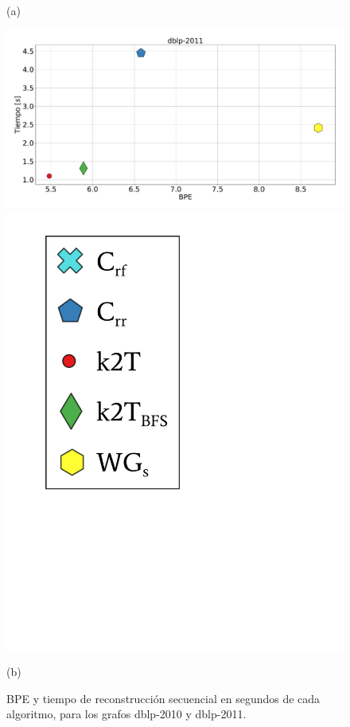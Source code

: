 \begin{figure}
\begin{minipage}{1\textwidth}
    			(a)		
    	\end{minipage}
    	
       	\begin{minipage}{1\textwidth}
    			\centering
    			\begin{minipage}{0.8\textwidth}
    				\centering
    				\includegraphics[width=1\linewidth]{img/bpeTimes/secuencial/dblp-2011.pdf}
    			\end{minipage}
    			\begin{minipage}{0.15\textwidth}
    				\centering
    				\includegraphics[scale=.24, clip, trim=70 290 290 30]{img/bpeTimes/labelSec.pdf}
    			\end{minipage}
    			
    			(b)		
    	\end{minipage}
    	
    \caption{BPE y tiempo de reconstrucción secuencial en segundos de cada algoritmo, para los grafos dblp-2010 y dblp-2011.}
    \label{fig:bpetSec2}
\end{figure}
